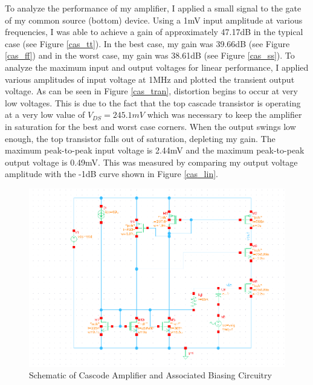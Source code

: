 \documentclass{article}
\begin{document}
To analyze the performance of my  amplifier, I applied a small signal to the gate of my common source (bottom) device. Using a 1mV input amplitude at various frequencies, I was able to achieve a gain of approximately 47.17dB in the typical case (see Figure \ref{cas_tt}). In the best case, my gain was 39.66dB (see Figure \ref{cas_ff}) and in the worst case, my gain was 38.61dB (see Figure \ref{cas_ss}). To analyze the maximum input and output voltages for linear performance, I applied various amplitudes of input voltage at 1MHz and plotted the transient output voltage. As can be seen in Figure \ref{cas_tran}, distortion begins to occur at very low voltages. This is due to the fact that the top cascade transistor is operating at a very low value of $V_{DS} = 245.1mV$ which was necessary to keep the amplifier in saturation for the best and worst case corners. When the output swings low enough, the top transistor falls out of saturation, depleting my gain. The maximum peak-to-peak input voltage is 2.44mV and the maximum peak-to-peak output voltage is 0.49mV. This was measured by comparing my output voltage amplitude with the -1dB curve shown in Figure \ref{cas_lin}.

\begin{figure}[H]
\centering
\includegraphics[width=6in]{2_cas_schematic.png}
\caption{Schematic of Cascode Amplifier and Associated Biasing Circuitry}
\label{cas_schem}
\end{figure}
\end{document}
